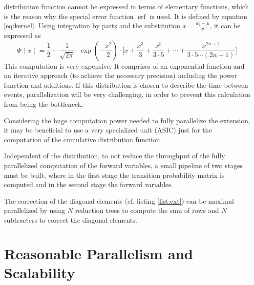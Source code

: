 \documentclass[mscthesis]{usiinfthesis}
\DeclareMathOperator{\erf}{erf}
\begin{document}
\begin{description}
        distribution function cannot be expressed in terms of elementary
        functions, which is the reason why the special error function $\erf$ is
        used. It is defined by equation \ref{eq:kernel}. Using integration by
        parts and the substitution $x = \frac{d_k-\mu}{\sigma}$, it can be
        expressed as
        \begin{equation}
            \Phi(x) = \frac{1}{2}
                + \frac{1}{\sqrt{2\pi}} \cdot \exp(-\frac{x^2}{2})
                \cdot \Bigg[ x+\frac{x^3}{3} + \frac{x^5}{3 \cdot 5} + \cdots
                + \frac{x^{2n+1}}{3 \cdot 5 \cdots (2n+1)} \Bigg]
        \end{equation}
        This computation is very expensive. It comprises of an exponential
        function and an iterative approach (to achieve the necessary precision)
        including the power function and additions. If this distribution is
        chosen to describe the time between events, parallelization will be very
        challenging, in order to prevent this calculation from being the
        bottleneck.
\end{description}

Considering the huge computation power needed to fully parallelize the
extension, it may be beneficial to use a very specialized unit (ASIC) just for
the computation of the cumulative distribution function.

Independent of the distribution, to not reduce the throughput of the fully
parallelized computation of the forward variables, a small pipeline of two
stages must be built, where in the first stage the transition probability
matrix is computed and in the second stage the forward variables.

The correction of the diagonal elements (cf. listing \ref{list:ext}) can be
maximal parallelized by using $N$ reduction trees to compute the sum of rows and
$N$ subtracters to correct the diagonal elements.

\section{Reasonable Parallelism and Scalability}
\label{ch:analysis_all}
\end{document}
